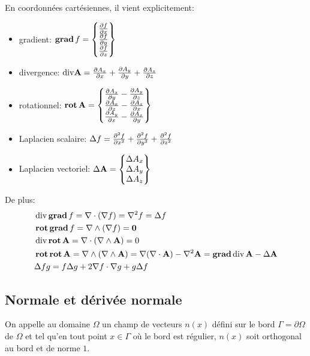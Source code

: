 \medskip
En coordonnées cartésiennes, il vient explicitement:
\begin{itemize}
   \item gradient: $ \gradb  f=
	\VV*{{\partial f \over \partial x}\\ {\partial f \over \partial y}\\ {\partial f \over \partial z}}$
   \item divergence: $ \mathrm{div} \mathbf{A}  =
	{\partial A_x \over \partial x} + {\partial A_y \over \partial y} + {\partial A_z \over \partial z}$
   \item rotationnel: $ \rotb  {\mathbf{A} } =
	\VV*{{\partial A_z \over \partial y} - {\partial A_y \over \partial z} \\
	{\partial A_x \over \partial z} - {\partial A_z \over \partial x} \\
	{\partial A_y \over \partial x} - {\partial A_x \over \partial y}}$
   \item Laplacien scalaire: $\Delta f  ={\partial^2 f \over \partial x^2} + {\partial^2 f \over \partial y^2} + {\partial^2 f \over \partial z^2}$
   \item Laplacien vectoriel: $\Delta \mathbf{A}  =
	\VV*{\Delta A_x \\ \Delta A_y \\ \Delta A_z}$
\end{itemize}

\medskip
De plus:
\begin{align}
&\dive \gradb f = \nabla \cdot (\nabla f) = \nabla^2 f = \Delta f\\
&\rotb\gradb f = \nabla \wedge ( \nabla f)
\colorred = \boldsymbol 0\\
&\dive\rotb \mathbf{A}  = \nabla \cdot ( \nabla \wedge \mathbf{A} ) \colorred = 0\\
&\rotb\rotb\mathbf{A}  = \nabla \wedge (\nabla \wedge \mathbf{A} ) =\nabla ( \nabla \cdot \mathbf{A} ) - \nabla^2 \mathbf{A}  = \gradb\dive \mathbf{A}  - \Delta \mathbf{A} \\
&\Delta f g = f \Delta g + 2 \nabla f \cdot \nabla g + g \Delta f
\end{align}

\medskip
\subsection{Normale et dérivée normale}

\begin{definition}[Normale]
On appelle  au domaine $\Omega$ un champ de vecteurs
$n(x)$ défini sur le bord $\Gamma=\partial\Omega$ de $\Omega$ et tel qu'en tout point
$x\in\Gamma$ où le bord est régulier, $n(x)$ soit orthogonal au bord
et de norme $1$.
\end{definition}

